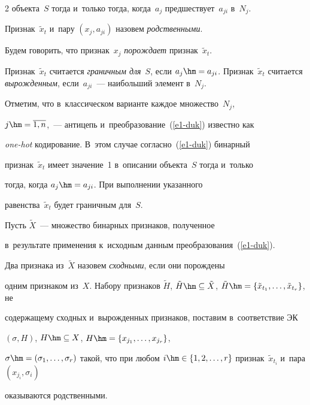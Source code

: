 \begin{multicols}{2}
объекта~$S$ тогда и~только тогда, когда~$a_j$ предшествует~$a_{ji}$ в~$N_j$. 


Признак~$\tilde{x}_t$ и~пару $(x_j, a_{ji})$ назовем \textit{родственными}. 


Будем говорить, что признак~$x_j$ \textit{порождает} признак~$\tilde{x}_t$. 


Признак~$\tilde{x}_t$ считается \textit{граничным для}~$S$, если $a_j\hm= 


a_{ji}$. Признак~$\tilde{x}_t$ считается \textit{вырожденным}, если~$a_{ji}$~--- наибольший элемент в~$N_j$.


  


  Отметим, что в~классическом варианте каждое множество~$N_j$, 


$j\hm=\overline{1,n}$,~--- антицепь и~преобразование~(\ref{e1-duk}) известно как 


\textit{one-hot} кодирование. В~этом случае согласно~(\ref{e1-duk}) бинарный 


признак~$\tilde{x}_t$ имеет значение~1 в~описании объекта~$S$ тогда и~только 


тогда, когда $a_j\hm= a_{ji}$. При выполнении указанного 


равенства~$\tilde{x}_t$ будет граничным для~$S$. 


  


  Пусть $\tilde{X}$~--- множество бинарных признаков, полученное 


в~результате применения к~исходным данным преобразования~(\ref{e1-duk}). 


Два признака из~$\tilde{X}$ назовем \textit{сходными}, если они порождены 


одним признаком из~$X$. Набору признаков $\tilde{H}$, $\tilde{H}\hm\subseteq 


\tilde{X}$, $\tilde{H}\hm= \{\tilde{x}_{t_1},\ldots , \tilde{x}_{t_r}\}$, не 


содержащему сходных и~вы\-рож\-ден\-ных признаков, поставим в~соответствие ЭК 


$(\sigma, H)$, $H\hm\subseteq X$, $H\hm= \{ x_{j_1}, \ldots , x_{j_r}\}$, 


$\sigma\hm= (\sigma_1, \ldots , \sigma_r)$ такой, что при любом $i\hm\in 


\{1,2,\ldots , r\}$ признак~$\tilde{x}_{t_i}$ и~пара $(x_{j_i}, \sigma_i)$ 


оказываются родственными. 






\end{multicols}
